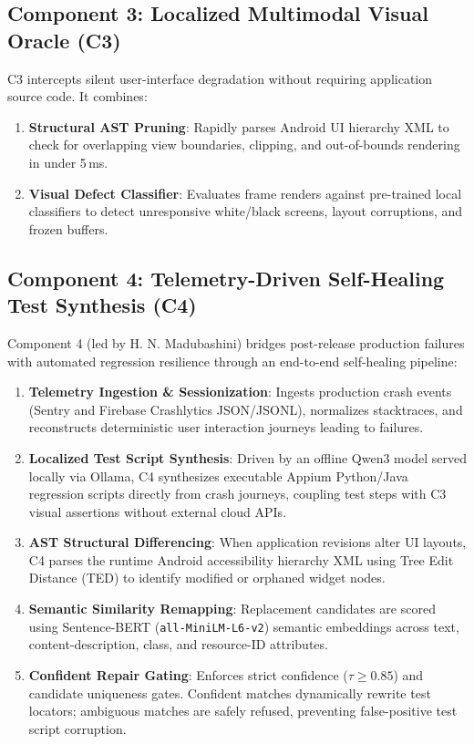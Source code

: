 \documentclass[conference]{IEEEtran}
\begin{document}
\subsection{Component 3: Localized Multimodal Visual Oracle (C3)}
C3 intercepts silent user-interface degradation without requiring application source code. It combines:
\begin{enumerate}
    \item \textbf{Structural AST Pruning}: Rapidly parses Android UI hierarchy XML to check for overlapping view boundaries, clipping, and out-of-bounds rendering in under 5\,ms.
    \item \textbf{Visual Defect Classifier}: Evaluates frame renders against pre-trained local classifiers to detect unresponsive white/black screens, layout corruptions, and frozen buffers.
\end{enumerate}

\subsection{Component 4: Telemetry-Driven Self-Healing Test Synthesis (C4)}
Component 4 (led by H. N. Madubashini) bridges post-release production failures with automated regression resilience through an end-to-end self-healing pipeline:
\begin{enumerate}
    \item \textbf{Telemetry Ingestion \& Sessionization}: Ingests production crash events (Sentry and Firebase Crashlytics JSON/JSONL), normalizes stacktraces, and reconstructs deterministic user interaction journeys leading to failures.
    \item \textbf{Localized Test Script Synthesis}: Driven by an offline Qwen3 model served locally via Ollama, C4 synthesizes executable Appium Python/Java regression scripts directly from crash journeys, coupling test steps with C3 visual assertions without external cloud APIs.
    \item \textbf{AST Structural Differencing}: When application revisions alter UI layouts, C4 parses the runtime Android accessibility hierarchy XML using Tree Edit Distance (TED) to identify modified or orphaned widget nodes.
    \item \textbf{Semantic Similarity Remapping}: Replacement candidates are scored using Sentence-BERT (\texttt{all-MiniLM-L6-v2}) semantic embeddings across text, content-description, class, and resource-ID attributes.
    \item \textbf{Confident Repair Gating}: Enforces strict confidence ($\tau \ge 0.85$) and candidate uniqueness gates. Confident matches dynamically rewrite test locators; ambiguous matches are safely refused, preventing false-positive test script corruption.
\end{enumerate}
\end{document}
